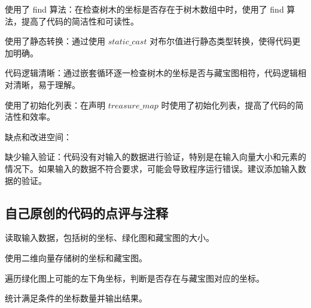 使用了 find 算法：在检查树木的坐标是否存在于树木数组中时，使用了 find 算法，提高了代码的简洁性和可读性。

使用了静态转换：通过使用 $static\_cast$ 对布尔值进行静态类型转换，使得代码更加明确。

代码逻辑清晰：通过嵌套循环逐一检查树木的坐标是否与藏宝图相符，代码逻辑相对清晰，易于理解。

使用了初始化列表：在声明 $treasure\_map$ 时使用了初始化列表，提高了代码的简洁性和效率。

缺点和改进空间：

缺少输入验证：代码没有对输入的数据进行验证，特别是在输入向量大小和元素的情况下。如果输入的数据不符合要求，可能会导致程序运行错误。建议添加输入数据的验证。

\subsection{自己原创的代码的点评与注释}

读取输入数据，包括树的坐标、绿化图和藏宝图的大小。

使用二维向量存储树的坐标和藏宝图。

遍历绿化图上可能的左下角坐标，判断是否存在与藏宝图对应的坐标。

统计满足条件的坐标数量并输出结果。

